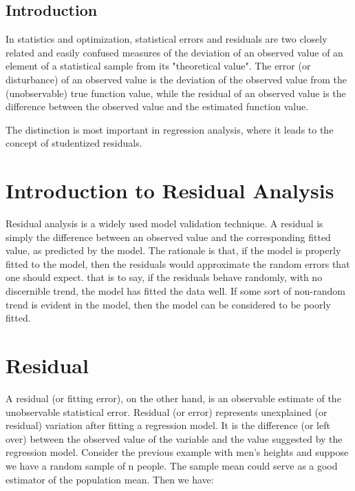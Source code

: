 \documentclass[Main.tex]{subfiles}
\begin{document}
\subsection{Introduction}
In statistics and optimization, statistical errors and residuals are two closely related and easily confused measures of the deviation of an observed value of an element of a statistical sample from its "theoretical value". The error (or disturbance) of an observed value is the deviation of the observed value from the (unobservable) true function value, while the residual of an observed value is the difference between the observed value and the estimated function value.

The distinction is most important in regression analysis, where it leads to the concept of studentized residuals.

\newpage

\section{Introduction to Residual Analysis}
Residual analysis is a widely used model validation technique. A residual is simply the difference between an observed value and the corresponding fitted value, as predicted by the model. The rationale is that, if the model is properly fitted to the model, then the residuals would approximate the random errors that one should expect.
that is to say, if the residuals behave randomly, with no discernible trend, the model has fitted the data well. If some sort of non-random trend is evident in the model, then the model can be considered to be poorly fitted.

\section{Residual}

A residual (or fitting error), on the other hand, is an observable estimate of the unobservable statistical error.
Residual (or error) represents unexplained (or residual) variation after fitting a regression model. It is the difference (or left over) between the observed value of the variable and the value suggested by the regression model.
Consider the previous example with men's heights and suppose we have a random sample of n people. The sample mean could serve as a good estimator of the population mean. Then we have:
\end{document}
